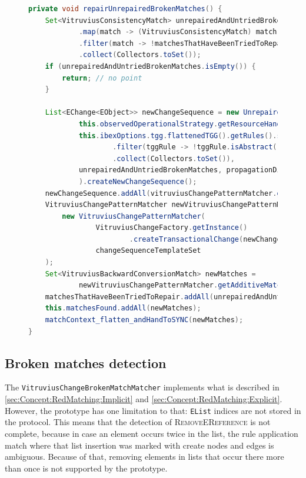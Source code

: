 \begin{figure}[]
\centering
\begin{lstlisting}[language=java, caption={repair handling in \texttt{VitruviusBackwardConversionTGGEngine}}, captionpos=b, label=implRepairUnrepairedBrokenMatches]
private void repairUnrepairedBrokenMatches() {
    Set<VitruviusConsistencyMatch> unrepairedAndUntriedBrokenMatches = this.vitruviusTGGIbexRedInterpreter.getRevokedRuleMatches().stream()
            .map(match -> (VitruviusConsistencyMatch) match)
            .filter(match -> !matchesThatHaveBeenTriedToRepair.contains(match))
            .collect(Collectors.toSet());
    if (unrepairedAndUntriedBrokenMatches.isEmpty()) {
        return; // no point
    }

    List<EChange<EObject>> newChangeSequence = new UnrepairedBrokenMatchOldChangesRetriever(
            this.observedOperationalStrategy.getResourceHandler(), 
            this.ibexOptions.tgg.flattenedTGG().getRules().stream()
                    .filter(tggRule -> !tggRule.isAbstract())
                    .collect(Collectors.toSet()),
            unrepairedAndUntriedBrokenMatches, propagationDirection
            ).createNewChangeSequence();
    newChangeSequence.addAll(vitruviusChangePatternMatcher.getUnmatchedEChanges());
    VitruviusChangePatternMatcher newVitruviusChangePatternMatcher = 
        new VitruviusChangePatternMatcher(
                VitruviusChangeFactory.getInstance()
                        .createTransactionalChange(newChangeSequence),
                changeSequenceTemplateSet
    );
    Set<VitruviusBackwardConversionMatch> newMatches = 
            newVitruviusChangePatternMatcher.getAdditiveMatches(propagationDirection);
    matchesThatHaveBeenTriedToRepair.addAll(unrepairedAndUntriedBrokenMatches);
    this.matchesFound.addAll(newMatches);
    matchContext_flatten_andHandToSYNC(newMatches);
}
\end{lstlisting}
\end{figure}

\subsection{Broken matches detection}
\label{sec:Implementation:PatternMatchingProcess:RedMatcher}
The \texttt{VitruviusChangeBrokenMatchMatcher} implements what is described in \autoref{sec:Concept:RedMatching:Implicit} and \autoref{sec:Concept:RedMatching:Explicit}.
However, the prototype has one limitation to that: \texttt{EList} indices are not stored in the protocol.
This means that the detection of \textsc{RemoveEReference} is not complete, because in case an element occurs twice in the list, the rule application match where that list insertion was marked with create nodes and edges is ambiguous.
Because of that, removing elements in lists that occur there more than once is not supported by the prototype.

